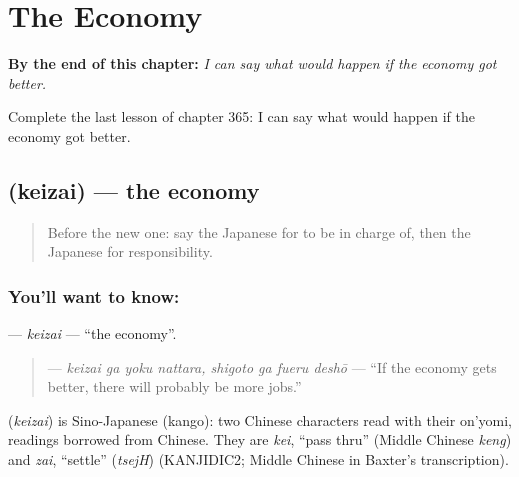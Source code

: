 
\chapter{The Economy}
\label{ch:ja-the-economy}

\begin{chapteropening}
\textbf{By the end of this chapter:} \emph{I can say what would happen if the economy got better.}

Complete the last lesson of chapter 365: I can say what would happen if the economy got better.
\end{chapteropening}

\section[\texorpdfstring{\ja{けいざい} (keizai)}{けいざい (keizai)}]{ (keizai) — the economy}

\label{lesson:JA-C365-keizai}



\begin{quote}
Before the new one: say the Japanese for to be in charge of, then the Japanese for responsibility.
\end{quote}

\subsection*{You'll want to know: }
\textbf{} — \emph{keizai} — \textquotedblleft{}the economy\textquotedblright{}.

\begin{quote}
\textbf{   } — \emph{keizai ga yoku nattara, shigoto ga fueru deshō} — \textquotedblleft{}If the economy gets better, there will probably be more jobs.\textquotedblright{}
\end{quote}

\begin{cousinweb}
\textbf{} (\emph{keizai}) is Sino-Japanese (kango): two Chinese characters read with their on'yomi, readings borrowed from Chinese. They are \emph{kei}, \textquotedblleft{}pass thru\textquotedblright{} (Middle Chinese \emph{keng}) and \emph{zai}, \textquotedblleft{}settle\textquotedblright{} (\emph{tsejH}) (KANJIDIC2; Middle Chinese in Baxter's transcription).
\end{cousinweb}

